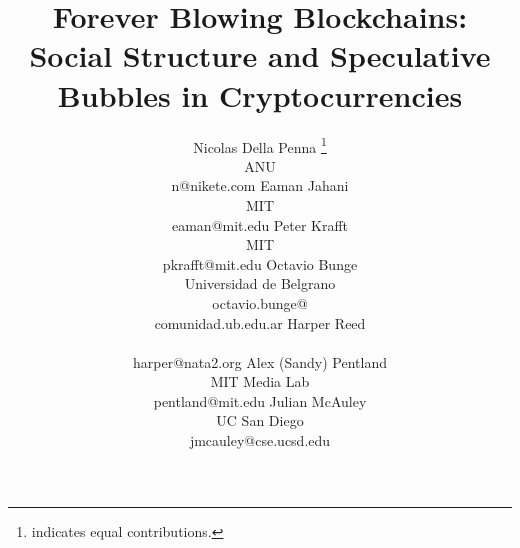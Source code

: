 \documentclass[letterpaper]{article}
\begin{document}
%
\title{Forever Blowing Blockchains: Social Structure and Speculative Bubbles in Cryptocurrencies}
\author{
Nicolas Della Penna \thanks{indicates equal contributions.}\\
ANU \\
n@nikete.com
\And
Eaman Jahani \footnotemark[1] \\
MIT \\
eaman@mit.edu
\And
Peter Krafft \\%
MIT \\
pkrafft@mit.edu
\And
Octavio Bunge \\%
Universidad de Belgrano \\
octavio.bunge@\\comunidad.ub.edu.ar
\AND
Harper Reed \\%
\\
harper@nata2.org
\And  %
Alex (Sandy) Pentland \\ %
MIT Media Lab \\
pentland@mit.edu
\And
Julian McAuley \\%
UC San Diego \\
jmcauley@cse.ucsd.edu
}
\maketitle
\end{document}
